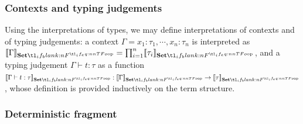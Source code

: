 \documentclass[11pt,a4paper]{article}
\theoremstyle{definition}
\theoremstyle{remark}
\providecommand{\setint}[1]{\llbracket #1\rrbracket_{\Set}}
\begin{document}
\subsubsection{Contexts and typing judgements}

Using the interpretations of types, we may define interpretations of contexts and of typing judgements: a context \( \Gamma = x_{1} : \tau_{1}, \cdots, x_{n} : \tau_{n} \) is interpreted as \( \setint{\Gamma} = \prod_{i = 1}^{n} \setint{\tau_{i}} \), and a typing judgement \( \Gamma \vdash t : \tau \) as a function \( \setint{\Gamma \vdash t : \tau}: \setint{\Gamma} \to \setint{\tau} \), whose definition is provided inductively on the term structure.

\subsubsection{Deterministic fragment}
\end{document}
